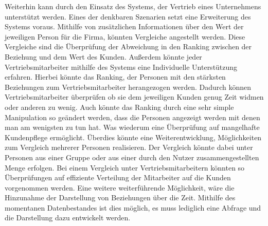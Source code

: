 Weiterhin kann durch den Einsatz des Systems, der Vertrieb eines Unternehmens unterstützt werden. Eines der denkbaren Szenarien setzt eine Erweiterung des Systems voraus. Mithilfe von zusätzlichen Informationen über den Wert der jeweiligen Person für die Firma, könnten Vergleiche angestellt werden. Diese Vergleiche sind die Überprüfung der Abweichung in den Ranking zwischen der Beziehung und dem Wert des Kunden.
Außerdem könnte jeder Vertriebsmitarbeiter mithilfe des Systems eine Individuelle Unterstützung erfahren. Hierbei könnte das Ranking, der Personen mit den stärksten Beziehungen zum Vertriebsmitarbeiter herangezogen werden. Dadurch können Vertriebsmitarbeiter überprüfen ob sie dem jeweiligen Kunden genug Zeit widmen oder anderen zu wenig. Auch könnte das Ranking durch eine sehr simple Manipulation so geändert werden, dass die Personen angezeigt werden mit denen man am wenigsten zu tun hat. Was wiederum eine Überprüfung auf mangelhafte Kundenpflege ermöglicht. 
Überdies könnte eine Weiterentwicklung, Möglichkeiten zum Vergleich mehrerer Personen realisieren. Der Vergleich könnte dabei unter Personen aus einer Gruppe oder aus einer durch den Nutzer zusammengestellten Menge erfolgen. Bei einem Vergleich unter Vertriebsmitarbeitern könnten so Überprüfungen auf effiziente Verteilung der Mitarbeiter auf die Kunden vorgenommen werden.
Eine weitere weiterführende Möglichkeit, wäre die Hinzunahme der Darstellung von Beziehungen über die Zeit. Mithilfe des momentanen Datenbestandes ist dies möglich, es muss lediglich eine Abfrage und die Darstellung dazu entwickelt werden.  
